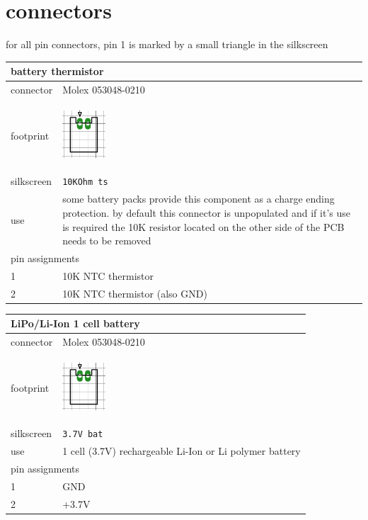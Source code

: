 \documentclass[a4paper,twoside]{refart}
\begin{document}

\section{connectors}
for all pin connectors, pin 1 is marked by a small triangle in the silkscreen

\begin{tabular}{ |l|p{8cm}| }
    \hline
    \multicolumn{2}{|l|}{battery thermistor} \\
    \hline
        connector & Molex 053048-0210 \\
        footprint & \begin{center} \includegraphics[height=50pt]{img/con2} \end{center} \\ \hline
        silkscreen & \verb"10KOhm ts" \\ \hline
        use & some battery packs provide this component as a charge ending protection. by default this connector is unpopulated and if it's use is required the 10K resistor located on the other side of the PCB needs to be removed \\
    \hline
    \multicolumn{2}{|l|}{pin assignments} \\
    \hline
        1   &   10K NTC thermistor \\
        2   &   10K NTC thermistor (also GND)\\
    \hline
\end{tabular}

\begin{tabular}{ |l|p{8cm}| }
    \hline
    \multicolumn{2}{|l|}{LiPo/Li-Ion 1 cell battery} \\
    \hline
        connector & Molex 053048-0210 \\
        footprint & \begin{center} \includegraphics[height=50pt]{img/con2} \end{center} \\ \hline
        silkscreen & \verb"3.7V bat"  \\ \hline
        use & 1 cell (3.7V) rechargeable Li-Ion or Li polymer battery \\
    \hline
    \multicolumn{2}{|l|}{pin assignments} \\
    \hline
        1   &   GND \\
        2   &   +3.7V \\
    \hline
\end{tabular}
\end{document}
